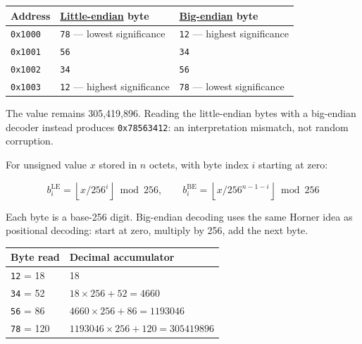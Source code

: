 {\def\LTcaptype{none} %
\begin{longtable}[]{@{}
  >{\raggedright\arraybackslash}p{}
  >{\raggedright\arraybackslash}p{}
  >{\raggedright\arraybackslash}p{}@{}}
\toprule\noalign{}
\begin{minipage}[b]{\linewidth}\raggedright
Address
\end{minipage} & \begin{minipage}[b]{\linewidth}\raggedright
\hyperref[appendix-367b6abf460e]{Little-endian} byte
\end{minipage} & \begin{minipage}[b]{\linewidth}\raggedright
\hyperref[appendix-92e040df969a]{Big-endian} byte
\end{minipage} \\
\midrule\noalign{}
\endhead
\bottomrule\noalign{}
\endlastfoot
\texttt{0x1000} & \texttt{78} --- lowest significance & \texttt{12} --- highest significance \\
\texttt{0x1001} & \texttt{56} & \texttt{34} \\
\texttt{0x1002} & \texttt{34} & \texttt{56} \\
\texttt{0x1003} & \texttt{12} --- highest significance & \texttt{78} --- lowest significance \\
\end{longtable}
}

The value remains 305,419,896. Reading the little-endian bytes with a big-endian decoder instead produces \texttt{0x78563412}: an interpretation mismatch, not random corruption.

For unsigned value \(x\) stored in \(n\) octets, with byte index \(i\) starting at zero:

\[
b_i^{\mathrm{LE}}=\left\lfloor x/256^i\right\rfloor\bmod256,\qquad
b_i^{\mathrm{BE}}=\left\lfloor x/256^{n-1-i}\right\rfloor\bmod256
\]

Each byte is a base-256 digit. Big-endian decoding uses the same Horner idea as positional decoding: start at zero, multiply by 256, add the next byte.

{\def\LTcaptype{none} %
\begin{longtable}[]{@{}ll@{}}
\toprule\noalign{}
Byte read & Decimal accumulator \\
\midrule\noalign{}
\endhead
\bottomrule\noalign{}
\endlastfoot
\texttt{12} = 18 & 18 \\
\texttt{34} = 52 & \(18\times256+52=4660\) \\
\texttt{56} = 86 & \(4660\times256+86=1193046\) \\
\texttt{78} = 120 & \(1193046\times256+120=305419896\) \\
\end{longtable}
}

